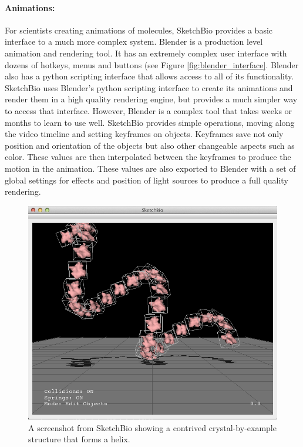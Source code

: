 \documentclass[twocolumn]{bmcart}%
\begin{document}
\paragraph*{Animations:}
For scientists creating animations of molecules, SketchBio provides a basic interface to a much more complex system.  Blender is a production level animation and rendering tool.  It has an extremely complex user interface with dozens of hotkeys, menus and buttons (see Figure \ref{fig:blender_interface}.  Blender also has a python scripting interface that allows access to all of its functionality.  SketchBio uses Blender's python scripting interface to create its animations and render them in a high quality rendering engine, but provides a much simpler way to access that interface.  However, Blender is a complex tool that takes weeks or months to learn to use well.  SketchBio provides simple operations, moving along the video timeline and setting keyframes on objects.  Keyframes save not only position and orientation of the objects but also other changeable aspects such as color.  These values are then interpolated between the keyframes to produce the motion in the animation.  These values are also exported to Blender with a set of global settings for effects and position of light sources to produce a full quality rendering.

\begin{figure}[h]
\centering
\includegraphics[width=0.8\columnwidth]{crystalByExample.png}
\caption{A screenshot from SketchBio showing a contrived crystal-by-example structure that forms a helix.}
\label{fig:crystal_by_example}
\end{figure}
\end{document}
